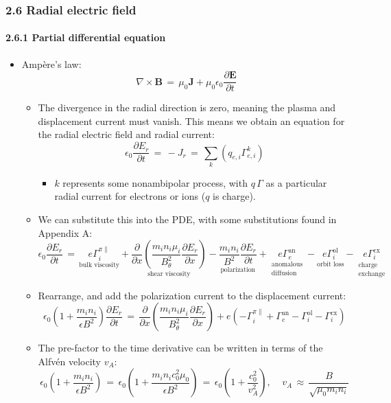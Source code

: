 \documentclass[]{article}
\providecommand{\tightlist}{%
  \setlength{\itemsep}{0pt}\setlength{\parskip}{0pt}}
\let\oldparagraph\paragraph
\renewcommand{\paragraph}[1]{\oldparagraph{#1}\mbox{}}
\begin{document}
\subsubsection{2.6 Radial electric field}\label{radial-electric-field}

\paragraph{2.6.1 Partial differential
equation}\label{partial-differential-equation}

\begin{itemize}
\item
  Ampère's law:
  \[\nabla \times \mathbf{B} \,=\, \mu_0 \mathbf{J} + \mu_0 \epsilon_0 \frac{\partial \mathbf{E}}{\partial t}\]

  \begin{itemize}
  \item
    The divergence in the radial direction is zero, meaning the plasma
    and displacement current must vanish. This means we obtain an
    equation for the radial electric field and radial current:
    \[\epsilon_0 \frac{\partial E_r}{\partial t} \,=\, -J_r \,=\, \sum_k \left(q_{e,i} \Gamma_{e,i}^k\right)\]

    \begin{itemize}
    \tightlist
    \item
      \(k\) represents some nonambipolar process, with \(q\,\Gamma\) as
      a particular radial current for electrons or ions (\(q\) is
      charge).
    \end{itemize}
  \item
    We can substitute this into the PDE, with some substitutions found
    in Appendix A:
    \[\epsilon_0 \frac{\partial E_r}{\partial t} \,=\, \underset{\text{bulk viscosity}}{e \Gamma_i^{\pi \parallel}} + \underset{\text{shear viscosity}}{\frac{\partial}{\partial x} \left(\frac{m_i n_i \mu_i}{B_\theta^2} \frac{\partial E_r}{\partial x}\right)} - \underset{\text{polarization}}{\frac{m_i n_i}{B^2} \frac{\partial E_r}{\partial t}} + \underset{\substack{\text{anomalous} \\ \text{diffusion}}}{e \Gamma_e^\text{an}} - \underset{\text{orbit loss}}{e \Gamma_i^\text{ol}} - \underset{\substack{\text{charge} \\ \text{exchange}}}{e \Gamma_i^\text{cx}}\]
  \item
    Rearrange, and add the polarization current to the displacement
    current:
    \[\epsilon_0 \left(1 + \frac{m_i n_i}{\epsilon B^2}\right) \frac{\partial E_r}{\partial t} \,=\, \frac{\partial}{\partial x} \left(\frac{m_i n_i \mu_i}{B_\theta^2} \frac{\partial E_r}{\partial x}\right) + e\left(-\Gamma_i^{\pi \parallel} + \Gamma_e^\text{an} - \Gamma_i^\text{ol} - \Gamma_i^\text{cx}\right)\]
  \item
    The pre-factor to the time derivative can be written in terms of the
    Alfvén velocity \(v_A\):
    \[\epsilon_0 \left(1 + \frac{m_i n_i}{\epsilon B^2}\right) \,=\, \epsilon_0 \left(1 + \frac{m_i n_i c_0^2 \mu_0}{\epsilon B^2}\right) \,=\, \epsilon_0 \left(1 + \frac{c_0^2}{v_A^2}\right), ~~~~~ v_A \,\approx\, \frac{B}{\sqrt{\mu_0 m_i n_i}}\]


\end{itemize}
\end{itemize}
\end{document}
